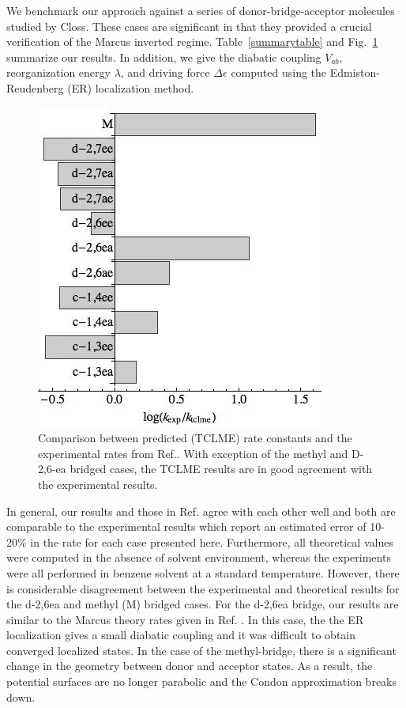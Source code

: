 We  benchmark our approach against a series of donor-bridge-acceptor
molecules studied by Closs\cite{closs1988determination,closs1988intramolecular,closs1989connection}.
These cases are significant in that they provided a crucial verification of the Marcus inverted regime.
Table~\ref{summarytable} and Fig.~\ref{compare}  summarize our results.
In addition, we give the diabatic coupling $V_{ab}$, reorganization energy $\lambda$, and driving force $\Delta \epsilon$
computed using the Edmiston-Reudenberg (ER) localization method.


\begin{figure}[t]
\includegraphics[width=0.5\columnwidth]{Chapters/chap2/Figure3}
\caption{Comparison between predicted (TCLME) rate constants and the experimental rates from Ref.\cite{miller1984intramolecular}.  With exception of
the methyl and D-2,6-ea bridged cases, the TCLME results are in good agreement with the experimental results.  }\label{compare}
\end{figure}


In general, our results and those in Ref.\cite{Subotnik:2010} agree with each other well and both are
comparable to the experimental results which report an estimated error of 10-20\% in the
rate for each case presented here.  Furthermore,  all theoretical values were computed
in the absence of solvent environment, whereas the experiments were all performed in benzene solvent at a standard temperature.
However,  there is considerable disagreement between the experimental and theoretical results for
the d-2,6ea and methyl (M) bridged cases.   For the d-2,6ea bridge,  our results are similar to the
Marcus theory rates given in Ref. \cite{Subotnik:2010}.  In this case, the
 the ER localization gives a  small diabatic coupling
 and it was  difficult to obtain converged localized states.
In the case of the methyl-bridge,  there is a significant change in the geometry between donor and acceptor states.
As a result,  the potential surfaces are no longer parabolic
and the Condon approximation breaks down.\cite{Subotnik:2010}








